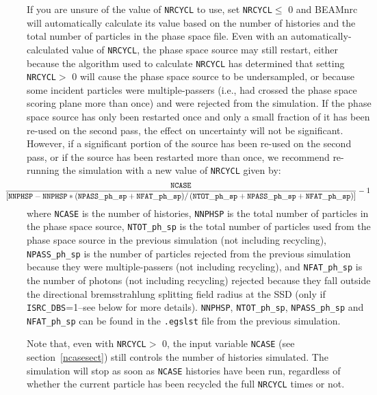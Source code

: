 \documentclass[12pt,twoside]{article}
\begin{document}
If you are unsure of the value of {\tt NRCYCL} to use, set
{\tt NRCYCL}$\leq$ 0 and BEAMnrc will automatically calculate its value
based on the number of histories and the total number of particles in the
phase space file.  Even with an automatically-calculated value of
{\tt NRCYCL}, the phase space source may still restart, either because
the algorithm used to calculate {\tt NRCYCL} has determined that
setting {\tt NRCYCL}$>$ 0 will cause the phase space source to
be undersampled, or because some incident particles were
multiple-passers (i.e., had crossed the phase space scoring plane
more than once) and were rejected from the simulation.  If the
phase space source has only been restarted once and only a small fraction
of it has been re-used on the second pass, the effect on uncertainty will not
be significant.  However, if a significant portion of the source has been
re-used on the second pass, or if the source has been restarted more than
once, we recommend re-running the simulation with a new value of
{\tt NRCYCL} given by:
 \[ \hspace*{-1cm}
 \frac{{\tt NCASE}}
 {\left[{\tt NNPHSP-NNPHSP*\left(NPASS\_ph\_sp+NFAT\_ph\_sp\right)}/
 \left({\tt NTOT\_ph\_sp+NPASS\_ph\_sp+NFAT\_ph\_sp}\right)\right]} -1
\]
where {\tt NCASE} is the number of histories, {\tt NNPHSP} is the total
number of
particles in the phase space source, {\tt NTOT\_ph\_sp} is the total number
of particles used from the phase space source in
the previous simulation (not including recycling),
{\tt NPASS\_ph\_sp} is the number of particles rejected from the previous
simulation because they
were multiple-passers (not including recycling), and
{\tt NFAT\_ph\_sp} is the number of photons (not including recycling)
rejected because they
fall outside the directional bremsstrahlung splitting field
radius at the SSD (only if {\tt ISRC\_DBS}=1--see below for more
details). {\tt NNPHSP},
{\tt NTOT\_ph\_sp}, {\tt NPASS\_ph\_sp} and
{\tt NFAT\_ph\_sp} can be found in the {\tt .egslst}
file from the previous simulation.

Note that, even with {\tt NRCYCL}$>$ 0, the input variable {\tt NCASE}
(see section~\ref{ncasesect}) still controls the number of histories
simulated.  The simulation will stop as soon as {\tt NCASE} histories
have been run, regardless of whether the current particle has been
recycled the full {\tt NRCYCL} times or not.
\end{document}
